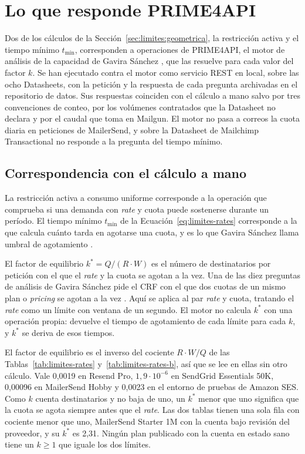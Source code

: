 \section{Lo que responde PRIME4API}
\label{sec:limites:prime4api}

Dos de los cálculos de la Sección~\ref{sec:limites:geometrica}, la restricción activa y el tiempo mínimo $t_{\min}$, corresponden a operaciones de PRIME4API, el motor de análisis de la capacidad de Gavira Sánchez \citep{gavira2026tfm}, que las resuelve para cada valor del factor $k$.
Se han ejecutado contra el motor como servicio REST en local, sobre las ocho Datasheets, con la petición y la respuesta de cada pregunta archivadas en el repositorio de datos.
Sus respuestas coinciden con el cálculo a mano salvo por tres convenciones de conteo, por los volúmenes contratados que la Datasheet no declara y por el caudal que toma en Mailgun.
El motor no pasa a correos la cuota diaria en peticiones de MailerSend, y sobre la Datasheet de Mailchimp Transactional no responde a la pregunta del tiempo mínimo.

\subsection{Correspondencia con el cálculo a mano}

La restricción activa a consumo uniforme corresponde a la operación que comprueba si una demanda con \textit{rate} y cuota puede sostenerse durante un período.
El tiempo mínimo $t_{\min}$ de la Ecuación~\eqref{eq:limites-rates} corresponde a la que calcula cuánto tarda en agotarse una cuota, y es lo que Gavira Sánchez llama umbral de agotamiento \citep{gavira2026tfm}.

El factor de equilibrio $k^{*} = Q/(R \cdot W)$ es el número de destinatarios por petición con el que el \textit{rate} y la cuota se agotan a la vez.
Una de las diez preguntas de análisis de Gavira Sánchez pide el CRF con el que dos cuotas de un mismo plan o \textit{pricing} se agotan a la vez \citep{gavira2026tfm}.
Aquí se aplica al par \textit{rate} y cuota, tratando el \textit{rate} como un límite con ventana de un segundo.
El motor no calcula $k^{*}$ con una operación propia: devuelve el tiempo de agotamiento de cada límite para cada $k$, y $k^{*}$ se deriva de esos tiempos.

El factor de equilibrio es el inverso del cociente $R \cdot W / Q$ de las Tablas~\ref{tab:limites-rates} y~\ref{tab:limites-rates-b}, así que se lee en ellas sin otro cálculo.
Vale 0,0019 en Resend Pro, $1{,}9 \cdot 10^{-6}$ en SendGrid Essentials 50K, 0,00096 en MailerSend Hobby y 0,0023 en el entorno de pruebas de Amazon SES.
Como $k$ cuenta destinatarios y no baja de uno, un $k^{*}$ menor que uno significa que la cuota se agota siempre antes que el \textit{rate}.
Las dos tablas tienen una sola fila con cociente menor que uno, MailerSend Starter 1M con la cuenta bajo revisión del proveedor, y su $k^{*}$ es 2,31.
Ningún plan publicado con la cuenta en estado sano tiene un $k \geq 1$ que iguale los dos límites.

